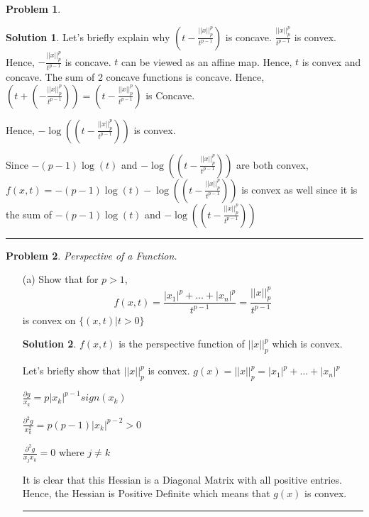 \documentclass{article}
\theoremstyle{definition}
\newtheorem{problem}{Problem}
\def\fline{\rule{0.75\linewidth}{0.5pt}}
\newcommand{\finishline}{\begin{center}\fline\end{center}}
\newtheorem*{solution*}{Solution}
\newenvironment{solution}{\begin{solution*}}{{\finishline} \end{solution*}}
\begin{document}
\begin{problem}
\begin{itemize}
\begin{solution}
        Let's briefly explain why $(t - \frac{||x||^p_p}{t^{p - 1}})$ is concave. $\frac{||x||^p_p}{t^{p - 1}}$ is convex. Hence, $-\frac{||x||^p_p}{t^{p - 1}}$ is concave. $t$ can be viewed as an affine map. Hence, $t$ is convex and concave. The sum of 2 concave functions is concave. Hence, $(t + (- \frac{||x||^p_p}{t^{p - 1}})) = (t - \frac{||x||^p_p}{t^{p - 1}})$ is Concave. 

        Hence, $- \log((t - \frac{||x||^p_p}{t^{p - 1}}))$ is convex. 

        Since $-(p - 1)\log(t)$ and $- \log((t - \frac{||x||^p_p}{t^{p - 1}}))$ are both convex, $f(x, t) = -(p - 1)\log(t) - \log((t - \frac{||x||^p_p}{t^{p - 1}}))$ is convex as well since it is the sum of $-(p - 1)\log(t)$ and $- \log((t - \frac{||x||^p_p}{t^{p - 1}}))$
    \end{solution}
\end{itemize}
    
\end{problem}

\begin{problem}
    \textit{Perspective of a Function.}

    \begin{itemize}
        \item[(a)] Show that for $p > 1$, 
        \begin{equation}
            f(x, t) = \frac{|x_1|^p + \dots + |x_n|^p}{t^{p - 1}} = \frac{||x||_p^p}{t^{p - 1}}
        \end{equation}
        is convex on $\{ (x, t) | t > 0\}$

        \begin{solution}
            $f(x, t)$ is the perspective function of $||x||_p^p$ which is convex. 

            Let's briefly show that $||x||_p^p$ is convex. \newline 
            $g(x) = ||x||_p^p = |x_1|^p + \dots + |x_n|^p$ \newline 

            $\frac{\partial g}{x_k} = p |x_k|^{p - 1} sign(x_k)$

            $\frac{\partial^2 g}{x_k^2} = p(p - 1) |x_k|^{p - 2} > 0$

            $\frac{\partial^2 g}{x_j x_k} =0$ where $j \neq k$

            It is clear that this Hessian is a Diagonal Matrix with all positive entries. Hence, the Hessian is Positive Definite which means that $g(x)$ is convex. 
        \end{solution}
    \end{itemize}
\end{problem}
\end{document}
